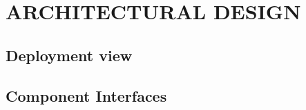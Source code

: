 \section{ARCHITECTURAL DESIGN}

	

	

	

	\subsection{Deployment view}

	
	
	\subsection{Component Interfaces}
	
	
